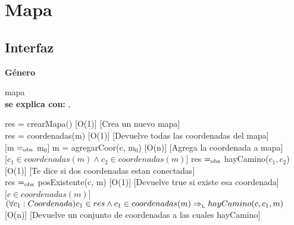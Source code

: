 \section{Mapa}


\subsection{Interfaz}

\parbox {1,7cm}{{\bf Género}} mapa\\
{\bf se explica con:}  , \\
\medskip

{res = crearMapa()}
[O(1)]
[Crea un nuevo mapa]
\\

{res = coordenadas(m)}
[O(1)]
[Devuelve todas las coordenadas del mapa]
\\

[m $=_{\mathrm{obs}}$ m$_0$]
{m = agregarCoor(c, m$_0$)}
[O(n)]
[Agrega la coordenada a mapa]
\\

[$c_1 \in coordenadas(m) \wedge c_2 \in coordenadas(m)$]
{res $=_{\mathrm{obs}}$ hayCamino($c_1, c_2$)}
[O(1)]
[Te dice si dos coordenadas estan conectadas]
\\


{res $=_{\mathrm{obs}}$ posExistente(c, m)}
[O(1)]
[Devuelve true si existe esa coordenada]
\\


[$c \in coordenadas(m)$]
{$(\forall c_1: Coordenada) c_1 \in res \wedge c_1 \in coordenadas(m) \Rightarrow_{\mathrm{\scriptscriptstyle{L}}} hayCamino(c, c_1, m)$}
[O(n)]
[Devuelve un conjunto de coordenadas a las cuales hayCamino]
\\


